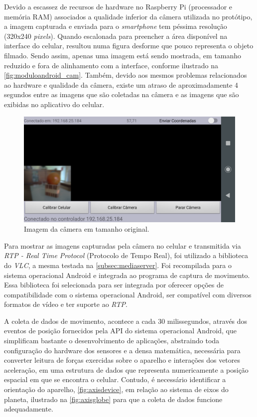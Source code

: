 Devido a escassez de recursos de hardware no Raspberry Pi (processador e memória RAM) associados a qualidade inferior da câmera utilizada no protótipo, a imagem capturada e enviada para o \textit{smartphone} tem péssima resolução (320x240 \textit{pixels}). Quando escalonada para preencher a área disponível na interface do celular, resultou numa figura desforme que pouco representa o objeto filmado. Sendo assim, apenas uma imagem está sendo mostrada, em tamanho reduzido e fora de alinhamento com a interface, conforme ilustrado na \autoref{fig:moduloandroid_cam}. Também, devido aos mesmos problemas relacionados ao hardware e qualidade da câmera, existe um atraso de aproximadamente 4 segundos entre as imagens que são coletadas na câmera e as imagens que são exibidas no aplicativo do celular.

\begin{figure}[H]
	\centering
	\includegraphics[width=1\textwidth]{figuras/modulo_android_2.png}
	\caption{Imagem da câmera em tamanho original.}
	\label{fig:moduloandroid_cam}
\end{figure}

Para mostrar as imagens capturadas pela câmera no celular e transmitida via \textit{RTP - Real Time Protocol} (Protocolo de Tempo Real), foi utilizado a biblioteca do \textit{VLC}, a mesma testada na \autoref{subsec:mediaserver}. Foi recompilada para o sistema operacional Android e integrada ao programa de captura de movimento. Essa biblioteca foi selecionada para ser integrada por oferecer opções de compatibilidade com o sistema operacional Android, ser compatível com diversos formatos de vídeo e ter suporte ao \textit{RTP}.\par

A coleta de dados de movimento, acontece a cada 30 milissegundos, através dos eventos de posição fornecidos pela API do sistema operacional Android, que simplificam bastante o desenvolvimento de aplicações, abstraindo toda configuração do hardware dos sensores e a densa matemática, necessária para converter leitura de forças exercidas sobre o aparelho e interações dos vetores aceleração, em uma estrutura de dados que representa numericamente a posição espacial em que se encontra o celular. Contudo, é necessário identificar a orientação do aparelho, \autoref{fig:axisdevice}, em relação ao sistema de eixos do planeta, ilustrado na \autoref{fig:axisglobe} para que a coleta de dados funcione adequadamente.\par

